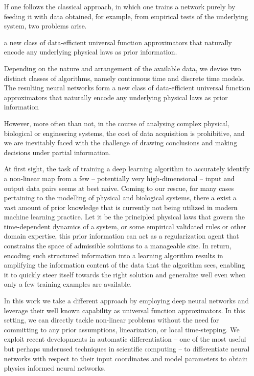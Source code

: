 If one follows the classical approach, in which one trains a network purely by feeding it with data obtained, for example, from empirical tests of the underlying system, two problems arise. 


a new class of data-efficient universal function approximators that naturally encode any underlying physical laws as prior information.



Depending on the nature and arrangement of the available data, we devise two distinct classes of algorithms, namely continuous time and discrete time models. The resulting neural networks form a new class of data-efficient universal function approximators that naturally encode any underlying physical laws as prior information

However, more often than not, in the course of analysing complex physical, biological or engineering systems, the cost of data acquisition is prohibitive, and we are inevitably faced with the challenge of drawing conclusions and making decisions under partial information.

At first sight, the task of training a deep learning algorithm to accurately identify a non-linear map from a few – potentially very high-dimensional – input and output data pairs seems at best naive. Coming to our rescue, for many cases pertaining to the modelling of physical and biological systems, there a exist a vast amount of prior knowledge that is currently not being utilized in modern machine learning practice. Let it be the principled physical laws that govern the time-dependent dynamics of a system, or some empirical validated rules or other domain expertise, this prior information can act as a regularization agent that constrains the space of admissible solutions to a manageable size. In return, encoding such structured information into a learning algorithm results in amplifying the information content of the data that the algorithm sees, enabling it to quickly steer itself towards the right solution and generalize well even when only a few training examples are available.



In this work we take a different approach by employing deep neural networks and leverage their well known capability as universal function approximators. In this setting, we can directly tackle non-linear problems without the need for committing to any prior assumptions, linearization, or local time-stepping. We exploit recent developments in automatic differentiation – one of the most useful but perhaps underused techniques in scientific computing – to differentiate neural networks with respect to their input coordinates and model parameters to obtain physics informed neural networks. 

